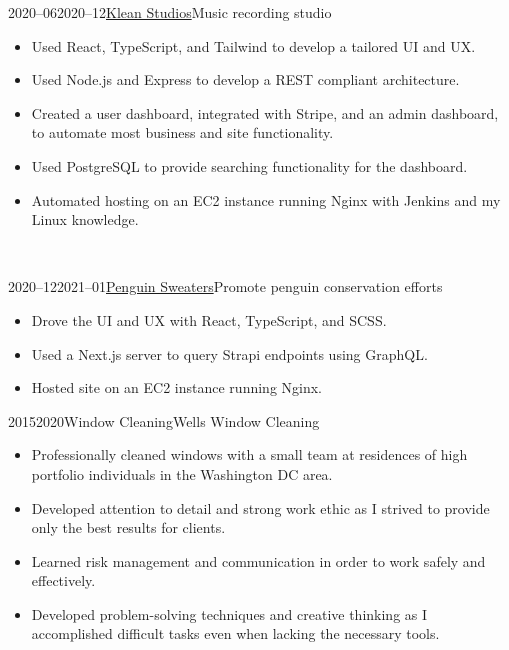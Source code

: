 \documentclass[10pt,a4paper,ragged2e,withhyper]{cvclass}
\begin{document}
\begin{paracol}{2}
\begin{mycolumn}
    \begin{cvdateevent}{2020--06}{2020--12}{\href{https://kleanstudio.com}{Klean Studios}}{Music recording studio}
        \begin{itemize}
            \item Used React, TypeScript, and Tailwind to develop a tailored UI and UX.
            \item Used Node.js and Express to develop a REST compliant architecture.
            \item Created a user dashboard, integrated with Stripe, and an admin dashboard, to automate most business and site functionality.
            \item Used PostgreSQL to provide searching functionality for the dashboard.
            \item Automated hosting on an EC2 instance running Nginx with Jenkins and my Linux knowledge.
        \end{itemize}
    \end{cvdateevent}
    \divider\\

    \begin{cvdateevent}{2020--12}{2021--01}{\href{http://penguins.treywilkinson.com}{Penguin Sweaters}}{Promote penguin conservation efforts}
        \begin{itemize}
            \item Drove the UI and UX with React, TypeScript, and SCSS.
            \item Used a Next.js server to query Strapi endpoints using GraphQL.
            \item Hosted site on an EC2 instance running Nginx.
        \end{itemize}
    \end{cvdateevent}

    \begin{cvdateevent}{2015}{2020}{Window Cleaning}{Wells Window Cleaning}
        \begin{itemize}
            \item Professionally cleaned windows with a small team at residences of high portfolio individuals in the Washington DC area.
            \item Developed attention to detail and strong work ethic as I strived to provide only the best results for clients.
            \item Learned risk management and communication in order to work safely and effectively.
            \item Developed problem-solving techniques and creative thinking as I accomplished difficult tasks even when lacking the necessary tools.
        \end{itemize}
    \end{cvdateevent}
    \divider\\


\end{mycolumn}
\end{paracol}
\end{document}
